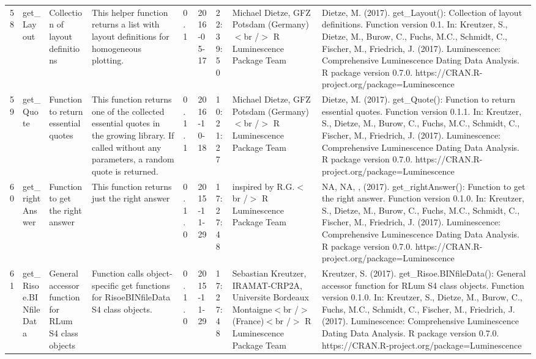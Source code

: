 \begin{table}[ht]
\begin{tabular}{rllllllll}
  58 & get\_Layout & Collection of layout definitions & This helper function returns a list with layout definitions for homogeneous plotting. & 0.1 & 2016-05-17 & 22:39:50
 & Michael Dietze, GFZ Potsdam (Germany)$<$br /$>$  R Luminescence Package Team & Dietze, M. (2017). get\_Layout(): Collection of layout definitions. Function version 0.1. In: Kreutzer, S., Dietze, M., Burow, C., Fuchs, M.C., Schmidt, C., Fischer, M., Friedrich, J. (2017). Luminescence: Comprehensive Luminescence Dating Data Analysis. R package version 0.7.0. https://CRAN.R-project.org/package=Luminescence
 \\ 
  59 & get\_Quote & Function to return essential quotes & This function returns one of the collected essential quotes in the growing library. If called without any parameters, a random quote is returned. & 0.1.1 & 2016-10-18 & 10:21:27
 & Michael Dietze, GFZ Potsdam (Germany)$<$br /$>$  R Luminescence Package Team & Dietze, M. (2017). get\_Quote(): Function to return essential quotes. Function version 0.1.1. In: Kreutzer, S., Dietze, M., Burow, C., Fuchs, M.C., Schmidt, C., Fischer, M., Friedrich, J. (2017). Luminescence: Comprehensive Luminescence Dating Data Analysis. R package version 0.7.0. https://CRAN.R-project.org/package=Luminescence
 \\ 
  60 & get\_rightAnswer & Function to get the right answer & This function returns just the right answer & 0.1.0 & 2015-11-29 & 17:27:48
 & inspired by R.G.$<$br /$>$  R Luminescence Package Team & NA, NA, ,  (2017). get\_rightAnswer(): Function to get the right answer. Function version 0.1.0. In: Kreutzer, S., Dietze, M., Burow, C., Fuchs, M.C., Schmidt, C., Fischer, M., Friedrich, J. (2017). Luminescence: Comprehensive Luminescence Dating Data Analysis. R package version 0.7.0. https://CRAN.R-project.org/package=Luminescence
 \\ 
  61 & get\_Risoe.BINfileData & General accessor function for RLum S4 class objects & Function calls object-specific get functions for RisoeBINfileData S4 class objects. & 0.1.0 & 2015-11-29 & 17:27:48
 & Sebastian Kreutzer, IRAMAT-CRP2A, Universite Bordeaux Montaigne$<$br /$>$ (France)$<$br /$>$  R Luminescence Package Team & Kreutzer, S. (2017). get\_Risoe.BINfileData(): General accessor function for RLum S4 class objects. Function version 0.1.0. In: Kreutzer, S., Dietze, M., Burow, C., Fuchs, M.C., Schmidt, C., Fischer, M., Friedrich, J. (2017). Luminescence: Comprehensive Luminescence Dating Data Analysis. R package version 0.7.0. https://CRAN.R-project.org/package=Luminescence
 \\ 

\end{tabular}
\end{table}
